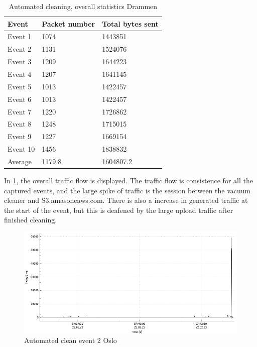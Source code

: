 \begin{table}[H]
\centering
\caption{Automated cleaning, overall statistics Drammen}
\label{tab:ACoverallDRA}
\begin{tabular}{|l|l|l|}
\hline
\textbf{Event} & \textbf{Packet number} & \textbf{Total bytes sent} \\ \hline
Event 1        & 1074                   & 1443851                   \\ \hline
Event 2        & 1131                   & 1524076                   \\ \hline
Event 3        & 1209                   & 1644223                   \\ \hline
Event 4        & 1207                   & 1641145                   \\ \hline
Event 5        & 1013                   & 1422457                   \\ \hline
Event 6        & 1013                   & 1422457                   \\ \hline
Event 7        & 1220                   & 1726862                   \\ \hline
Event 8        & 1248                   & 1715015                   \\ \hline
Event 9        & 1227                   & 1669154                   \\ \hline
Event 10       & 1456                   & 1838832                   \\ \hline
Average        & 1179.8                 & 1604807.2                 \\ \hline
\end{tabular}
\end{table}

In \ref{fig:Ac-graph}, the overall traffic flow is displayed. The traffic flow is consistence for all the captured events, and the large spike of traffic is the session between the vacuum cleaner and S3.amasoneaws.com. There is also a increase in generated traffic at the start of the event, but this is 
deafened by the large upload traffic after finished cleaning.

\begin{figure}[H]
    \centering
    \includegraphics[width=\textwidth]{figures/AC-graph.png}
    \caption{Automated clean event 2 Oslo}
    \label{fig:Ac-graph}
\end{figure}

